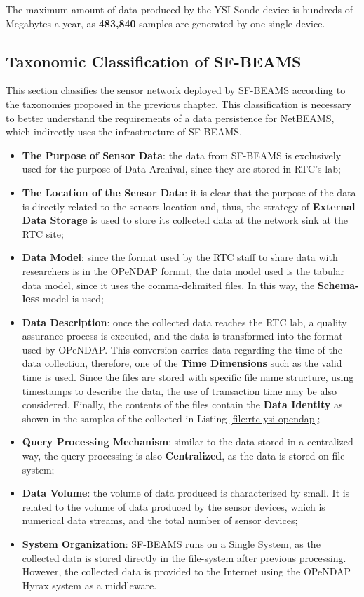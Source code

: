 The maximum amount of data produced by the YSI Sonde device is hundreds of Megabytes
a year, as \textbf{483,840} samples are generated by one single device. 

\subsection{Taxonomic Classification of SF-BEAMS}

This section classifies the sensor network deployed by SF-BEAMS according to
the taxonomies proposed in the previous chapter. This classification is
necessary to better understand the requirements of a data persistence for
NetBEAMS, which indirectly uses the infrastructure of SF-BEAMS.

\begin{itemize}
  \item \textbf{The Purpose of Sensor Data}: the data from SF-BEAMS is exclusively
  used for the purpose of Data Archival, since they are stored in RTC's lab;
  \item \textbf{The Location of the Sensor Data}: it is clear that the purpose
  of the data is directly related to the sensors location and, thus, the
  strategy of \textbf{External Data Storage} is used to store its collected
  data at the network sink at the RTC site;
  \item \textbf{Data Model}: since the format used by the RTC staff to share
  data with researchers is in the OPeNDAP format, the data
  model used is the tabular data model, since it uses the comma-delimited
  files. In this way, the \textbf{Schema-less} model is used;
  \item \textbf{Data Description}: once the collected data reaches the RTC
  lab, a quality assurance process is executed, and the data is transformed
  into the format used by OPeNDAP. This conversion carries data regarding
  the time of the data collection, therefore, one of the
  \textbf{Time Dimensions} such as the valid time is used. Since the files are stored
  with specific file name structure, using timestamps to describe the data, the
  use of transaction time may be also considered. Finally, the contents of the
  files contain the \textbf{Data Identity} as shown in the samples of
  the collected in Listing \ref{file:rtc-ysi-opendap};
  \item \textbf{Query Processing Mechanism}: similar to the data stored in a
  centralized way, the query processing is also \textbf{Centralized}, as the
  data is stored on file system;
  \item \textbf{Data Volume}: the volume of data produced is characterized by small.
 It is related to the volume of data produced by the sensor devices,
  which is numerical data streams, and the total number of sensor devices;
  \item \textbf{System Organization}: SF-BEAMS runs on a Single System, as
  the collected data is stored directly in the file-system after previous 
  processing. However, the collected data is provided to the Internet using
  the OPeNDAP Hyrax system as a middleware.
\end{itemize}

